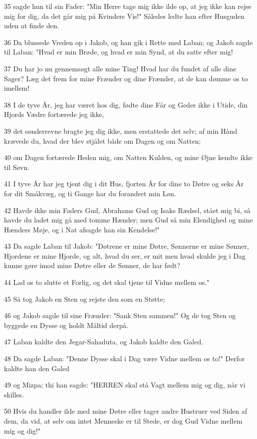 \par 35 sagde hun til sin Fader: "Min Herre tage mig ikke ilde op, at jeg ikke kan rejse mig for dig, da det går mig på Kvinders Vis!" Således ledte han efter Husguden uden at finde den.
\par 36 Da blussede Vreden op i Jakob, og han gik i Rette med Laban; og Jakob sagde til Laban: "Hvad er min Brøde, og hvad er min Synd, at du satte efter mig!
\par 37 Du har jo nu gennemsøgt alle mine Ting! Hvad har du fundet af alle dine Sager? Læg det frem for mine Frænder og dine Frænder, at de kan dømme os to imellem!
\par 38 I de tyve År, jeg har været hos dig, fødte dine Får og Geder ikke i Utide, din Hjords Vædre fortærede jeg ikke,
\par 39 det sønderrevne bragte jeg dig ikke, men erstattede det selv; af min Hånd krævede du, hvad der blev stjålet både om Dagen og om Natten;
\par 40 om Dagen fortærede Heden mig, om Natten Kulden, og mine Øjne kendte ikke til Søvn.
\par 41 I tyve År har jeg tjent dig i dit Hus, fjorten År for dine to Døtre og seks År for dit Småkvæg, og ti Gange har du forandret min Løn.
\par 42 Havde ikke min Faders Gud, Abrahams Gud og Isaks Rædsel, stået mig bi, så havde du ladet mig gå med tomme Hænder; men Gud så min Elendighed og mine Hænders Møje, og i Nat afsagde han sin Kendelse!"
\par 43 Da sagde Laban til Jakob: "Døtrene er mine Døtre, Sønnerne er mine Sønner, Hjordene er mine Hjorde, og alt, hvad du ser, er mit men hvad skulde jeg i Dag kunne gøre imod mine Døtre eller de Sønner, de har født?
\par 44 Lad os to slutte et Forlig, og det skal tjene til Vidne mellem os."
\par 45 Så tog Jakob en Sten og rejste den som en Støtte;
\par 46 og Jakob sagde til sine Frænder: "Sank Sten sammen!" Og de tog Sten og byggede en Dysse og holdt Måltid derpå.
\par 47 Laban kaldte den Jegar-Sahaduta, og Jakob kaldte den Galed.
\par 48 Da sagde Laban: "Denne Dysse skal i Dag være Vidne mellem os to!" Derfor kaldte han den Galed
\par 49 og Mizpa; thi han sagde: "HERREN skal stå Vagt mellem mig og dig, når vi skilles.
\par 50 Hvis du handler ilde med mine Døtre eller tager andre Hustruer ved Siden af dem, da vid, at selv om intet Menneske er til Stede, er dog Gud Vidne mellem mig og dig!"
